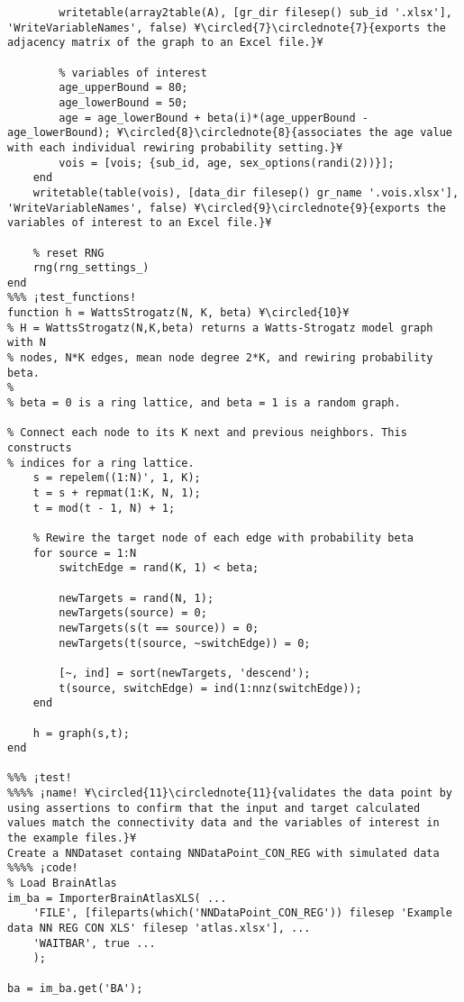 \documentclass{tufte-handout}
\begin{document}
\begin{lstlisting}
        writetable(array2table(A), [gr_dir filesep() sub_id '.xlsx'], 'WriteVariableNames', false) ¥\circled{7}\circlednote{7}{exports the adjacency matrix of the graph to an Excel file.}¥

        % variables of interest
        age_upperBound = 80;
        age_lowerBound = 50;
        age = age_lowerBound + beta(i)*(age_upperBound - age_lowerBound); ¥\circled{8}\circlednote{8}{associates the age value with each individual rewiring probability setting.}¥
        vois = [vois; {sub_id, age, sex_options(randi(2))}];
    end
    writetable(table(vois), [data_dir filesep() gr_name '.vois.xlsx'], 'WriteVariableNames', false) ¥\circled{9}\circlednote{9}{exports the variables of interest to an Excel file.}¥

    % reset RNG
    rng(rng_settings_)
end
%%% ¡test_functions!
function h = WattsStrogatz(N, K, beta) ¥\circled{10}¥
% H = WattsStrogatz(N,K,beta) returns a Watts-Strogatz model graph with N
% nodes, N*K edges, mean node degree 2*K, and rewiring probability beta.
%
% beta = 0 is a ring lattice, and beta = 1 is a random graph.

% Connect each node to its K next and previous neighbors. This constructs
% indices for a ring lattice.
    s = repelem((1:N)', 1, K);
    t = s + repmat(1:K, N, 1);
    t = mod(t - 1, N) + 1;
    
    % Rewire the target node of each edge with probability beta
    for source = 1:N
        switchEdge = rand(K, 1) < beta;
        
        newTargets = rand(N, 1);
        newTargets(source) = 0;
        newTargets(s(t == source)) = 0;
        newTargets(t(source, ~switchEdge)) = 0;
        
        [~, ind] = sort(newTargets, 'descend');
        t(source, switchEdge) = ind(1:nnz(switchEdge));
    end
    
    h = graph(s,t);
end

%%% ¡test! 
%%%% ¡name! ¥\circled{11}\circlednote{11}{validates the data point by using assertions to confirm that the input and target calculated values match the connectivity data and the variables of interest in the example files.}¥
Create a NNDataset containg NNDataPoint_CON_REG with simulated data
%%%% ¡code!
% Load BrainAtlas
im_ba = ImporterBrainAtlasXLS( ...
    'FILE', [fileparts(which('NNDataPoint_CON_REG')) filesep 'Example data NN REG CON XLS' filesep 'atlas.xlsx'], ...
    'WAITBAR', true ...
    );

ba = im_ba.get('BA');


\end{lstlisting}
\end{document}
